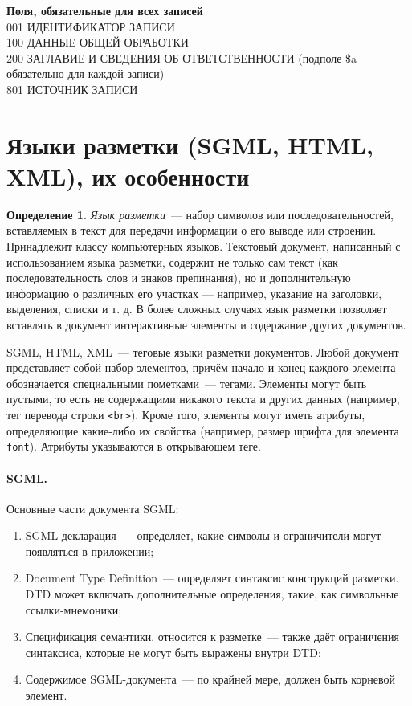 \documentclass[12pt]{article}
\theoremstyle{definition}
\newtheorem*{defn}{Определение}
\theoremstyle{remark}
\numberwithin{equation}{section}
\begin{document}
\textbf{Поля, обязательные для всех записей}
\\
001 ИДЕНТИФИКАТОР ЗАПИСИ \\
100 ДАННЫЕ ОБЩЕЙ ОБРАБОТКИ \\
200 ЗАГЛАВИЕ И СВЕДЕНИЯ ОБ ОТВЕТСТВЕННОСТИ (подполе \$a обязательно для каждой записи) \\
801 ИСТОЧНИК ЗАПИСИ \\

\section{Языки разметки (SGML, HTML, XML), их особенности}
\begin{defn}
{\sl Язык разметки}~--- набор символов или последовательностей, вставляемых в текст для передачи информации о его выводе или строении. Принадлежит классу компьютерных языков. Текстовый документ, написанный с использованием языка разметки, содержит не только сам текст (как последовательность слов и знаков препинания), но и дополнительную информацию о различных его участках — например, указание на заголовки, выделения, списки и т. д. В более сложных случаях язык разметки позволяет вставлять в документ интерактивные элементы и содержание других документов.
\end{defn}
SGML, HTML, XML~--- теговые языки разметки документов. Любой документ представляет собой набор элементов, причём начало и конец каждого элемента обозначается специальными пометками~--- тегами. Элементы могут быть пустыми, то есть не содержащими никакого текста и других данных (например, тег перевода строки \texttt{<br>}). Кроме того, элементы могут иметь атрибуты, определяющие какие\nobreakdash-либо их свойства (например, размер шрифта для элемента \texttt{font}). Атрибуты указываются в открывающем теге.

\paragraph{SGML.}
Основные части документа SGML:
\begin{enumerate}
	\item SGML-декларация~--- определяет, какие символы и ограничители могут появляться в приложении;
	\item Document Type Definition~--- определяет синтаксис конструкций разметки. DTD может включать дополнительные определения, такие, как символьные ссылки\nobreakdash-мнемоники;
	\item Спецификация семантики, относится к разметке~--- также даёт ограничения синтаксиса, которые не могут быть выражены внутри DTD;
	\item Содержимое SGML\nobreakdash-документа~--- по крайней мере, должен быть корневой элемент.
\end{enumerate}
\end{document}
